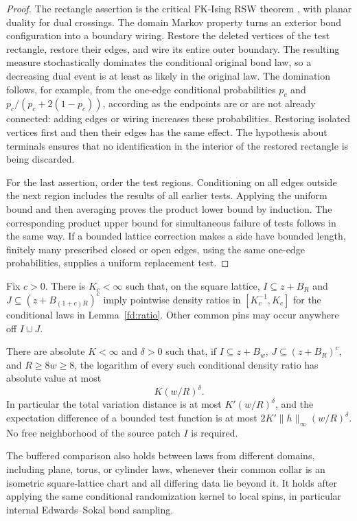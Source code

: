 \begin{proof}
The rectangle assertion is the critical FK-Ising RSW theorem
\cite[arXiv version~1, Theorem~1]{DHN2011}, with planar duality for dual crossings.
The domain Markov property turns an exterior bond configuration into a
boundary wiring.  Restore the deleted vertices of the test rectangle,
restore their edges, and wire its entire outer boundary.  The resulting
measure stochastically dominates the conditional original bond law, so a
decreasing dual event is at least as likely in the original law.  The
domination follows, for example, from the one-edge conditional probabilities
\(p_c\) and \(p_c/(p_c+2(1-p_c))\), according as the endpoints are or are
not already connected: adding edges or wiring increases these probabilities.
Restoring isolated vertices first and then their edges has the same effect.
The hypothesis about terminals ensures that no identification in the
interior of the restored rectangle is being discarded.

For the last assertion, order the test regions.  Conditioning on all edges
outside the next region includes the results of all earlier tests.  Applying
the uniform bound and then averaging proves the product lower bound by
induction.  The corresponding product upper bound for simultaneous failure
of tests follows in the same way.  If a bounded lattice correction makes
a side have bounded length, finitely many prescribed closed or open edges,
using the same one-edge probabilities, supplies a uniform replacement test.
\end{proof}

\begin{corollary}
\label{fd:buffered-ratio}\label{fd:patch-ratio}
Fix \(c>0\).  There is \(K_c<\infty\) such that, on the square lattice,
\(I\subseteq z+B_R\) and \(J\subseteq(z+B_{(1+c)R})^c\) imply
pointwise density ratios in \([K_c^{-1},K_c]\) for the conditional laws
in Lemma~\ref{fd:ratio}.  Other common pins may occur anywhere off
\(I\cup J\).

There are absolute \(K<\infty\) and \(\delta>0\) such that, if
\(I\subseteq z+B_w\), \(J\subseteq(z+B_R)^c\), and \(R\ge8w\ge8\),
the logarithm of every such conditional density ratio has absolute value
at most
\begin{equation}
 K(w/R)^\delta.
 \label{fd:patch-power}
\end{equation}
In particular the total variation distance is at most
\(K'(w/R)^\delta\), and the expectation difference of a bounded test
function is at most \(2K'\|h\|_\infty(w/R)^\delta\).
No free neighborhood of the source patch \(I\) is required.

The buffered comparison also holds between laws from different domains,
including plane, torus, or cylinder laws, whenever their common collar
is an isometric square-lattice chart and all differing data lie beyond it.
It holds after applying the same conditional randomization kernel to local
spins, in particular internal Edwards--Sokal bond sampling.
\end{corollary}

